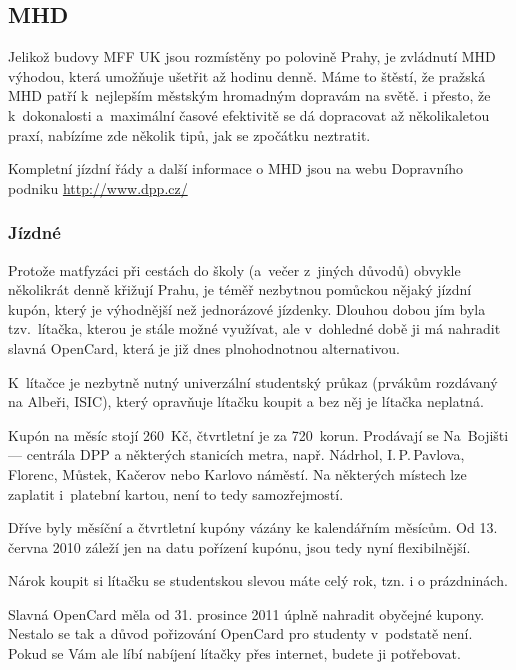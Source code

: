 \subsection{MHD}

Jelikož budovy MFF UK jsou rozmístěny po polovině Prahy, je
zvládnutí MHD výhodou, která umožňuje ušetřit až hodinu denně.
Máme to štěstí, že pražská MHD patří k~nejlepším městským
hromadným dopravám na světě. i přesto, že k~dokonalosti
a~maximální časové efektivitě se dá dopracovat až několikaletou
praxí, nabízíme zde několik tipů, jak se zpočátku neztratit.


Kompletní jízdní řády a další informace o MHD jsou na webu
Dopravního podniku \url{http://www.dpp.cz/}

\subsubsection{Jízdné}

Protože matfyzáci při cestách do školy (a~večer z~jiných důvodů)
obvykle několikrát denně křižují Prahu, je téměř nezbytnou
pomůckou nějaký jízdní kupón, který je výhodnější než jednorázové
jízdenky. Dlouhou dobou jím byla tzv.~lítačka, kterou je stále
možné využívat, ale v~dohledné době ji má nahradit slavná
OpenCard, která je již dnes plnohodnotnou alternativou.


K~lítačce je nezbytně nutný univerzální studentský průkaz
(prvákům rozdávaný na Albeři, ISIC), který opravňuje lítačku
koupit a bez něj je lítačka neplatná. 

Kupón na měsíc stojí 260~Kč, čtvrtletní je za 720~korun.
Prodávají se Na~Bojišti --- centrála DPP a některých stanicích
metra, např. Nádrhol, I.$\,$P.$\,$Pavlova, Florenc, Můstek,
Kačerov nebo Karlovo náměstí. Na některých místech lze zaplatit
i~platební kartou, není to tedy samozřejmostí.

Dříve byly měsíční a čtvrtletní kupóny vázány ke kalendářním
měsícům. Od 13. června 2010 záleží jen na datu pořízení kupónu,
jsou tedy nyní flexibilnější.

Nárok koupit si lítačku se studentskou slevou máte celý rok,
tzn. i o prázdninách.



Slavná OpenCard měla od 31. prosince 2011 úplně nahradit obyčejné kupony. Nestalo se tak a důvod pořizování OpenCard pro studenty v~podstatě není. Pokud se Vám ale líbí nabíjení lítačky přes internet, budete ji potřebovat.

